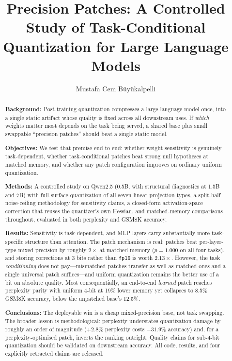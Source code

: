 \documentclass[manuscript, screen, review]{jair}
\newcommand{\code}[1]{\texttt{#1}}
\begin{document}
\title[Precision Patches]{Precision Patches: A Controlled Study of
Task-Conditional Quantization for Large Language Models}

\author{Mustafa Cem B\"uy\"ukalpelli}
\renewcommand{\shortauthors}{B\"uy\"ukalpelli}

\begin{abstract}
{\bf Background:}
Post-training quantization compresses a large language model once, into a
single static artifact whose quality is fixed across all downstream uses. If
\emph{which} weights matter most depends on the task being served, a shared
base plus small swappable ``precision patches'' should beat a single static
model.

{\bf Objectives:}
We test that premise end to end: whether weight sensitivity is genuinely
task-dependent, whether task-conditional patches beat strong null hypotheses at
matched memory, and whether any patch configuration improves on ordinary
uniform quantization.

{\bf Methods:}
A controlled study on Qwen2.5 (0.5B, with structural diagnostics at 1.5B and
7B) with full-surface quantization of all seven linear projection types, a
split-half noise-ceiling methodology for sensitivity claims, a closed-form
activation-space correction that reuses the quantizer's own Hessian, and
matched-memory comparisons throughout, evaluated in both perplexity and GSM8K
accuracy.

{\bf Results:}
Sensitivity is task-dependent, and MLP layers carry substantially more
task-specific structure than attention. The patch mechanism is real: patches
beat per-layer-type mixed precision by roughly $2\times$ at matched memory
($p{=}1.000$ on all four tasks), and storing corrections at 3 bits rather than
\code{fp16} is worth $2.13\times$. However, the task \emph{conditioning} does
not pay---mismatched patches transfer as well as matched ones and a single
universal patch suffices---and uniform quantization remains the better use of a
bit on absolute quality. Most consequentially, an end-to-end \emph{learned}
patch reaches perplexity parity with uniform 4-bit at 19\% lower memory yet
collapses to 8.5\% GSM8K accuracy, below the unpatched base's 12.5\%.

{\bf Conclusions:}
The deployable win is a cheap mixed-precision base, not task swapping. The
broader lesson is methodological: perplexity understates quantization damage by
roughly an order of magnitude ($+2.8\%$ perplexity costs $-31.9\%$ accuracy)
and, for a perplexity-optimised patch, inverts the ranking outright. Quality
claims for sub-4-bit quantization should be validated on downstream accuracy.
All code, results, and four explicitly retracted claims are released.
\end{abstract}
\end{document}
